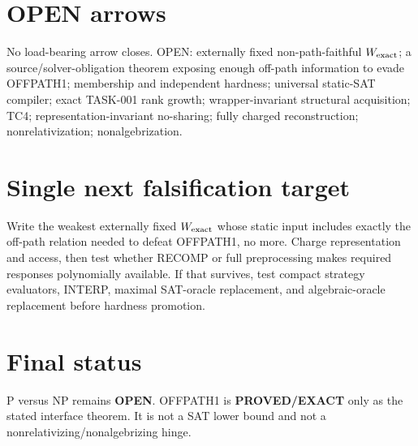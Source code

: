\documentclass[11pt]{article}
\begin{document}
\section*{OPEN arrows}
No load-bearing arrow closes. OPEN: externally fixed non-path-faithful \(W_{\rm exact}\); a source/solver-obligation theorem exposing enough off-path information to evade OFFPATH1; membership and independent hardness; universal static-SAT compiler; exact TASK-001 rank growth; wrapper-invariant structural acquisition; TC4; representation-invariant no-sharing; fully charged reconstruction; nonrelativization; nonalgebrization.

\section*{Single next falsification target}
Write the weakest externally fixed \(W_{\rm exact}\) whose static input includes exactly the off-path relation needed to defeat OFFPATH1, no more. Charge representation and access, then test whether RECOMP or full preprocessing makes required responses polynomially available. If that survives, test compact strategy evaluators, INTERP, maximal SAT-oracle replacement, and algebraic-oracle replacement before hardness promotion.

\section*{Final status}
P versus NP remains \textbf{OPEN}. OFFPATH1 is \textbf{PROVED/EXACT} only as the stated interface theorem. It is not a SAT lower bound and not a nonrelativizing/nonalgebrizing hinge.

\end{document}
